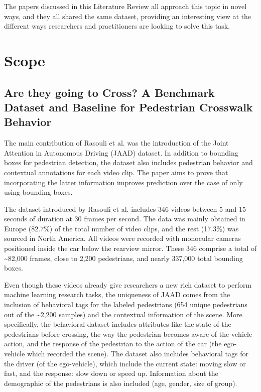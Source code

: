 \documentclass[journal,letterpaper]{IEEEtran}
\begin{document}
The papers discussed in this Literature Review all approach this topic in novel ways, and they all shared the same dataset, providing an interesting view at the different ways researchers and practitioners are looking to solve this task.
\section{Scope}\label{sec:scope}
\subsection{Are they going to Cross? A Benchmark Dataset and Baseline for Pedestrian Crosswalk Behavior}\label{are-they-going-to-cross-a-benchmark-dataset-and-baseline-for-pedestrian-crosswalk-behavior-rasouli2017iccvw}
The main contribution of Rasouli et al. was the introduction of the Joint Attention in Autonomous Driving (JAAD) dataset. In addition to bounding boxes for pedestrian detection, the dataset also includes pedestrian behavior and contextual annotations for each video clip. The paper aims to prove that incorporating the latter information improves prediction over the case of only using bounding boxes.

The dataset introduced by Rasouli et al. includes 346 videos between 5 and 15 seconds of duration at 30 frames per second. The data was mainly obtained in Europe (82.7\%) of the total number of video clips, and the rest (17.3\%) was sourced in North America. All videos were recorded with monocular cameras positioned inside the car below the rearview mirror. These 346 comprise a total of \textasciitilde82,000 frames, close to 2,200 pedestrians, and nearly 337,000 total bounding boxes.

Even though these videos already give researchers a new rich dataset to perform machine learning research tasks, the uniqueness of JAAD comes from the inclusion of behavioral tags for the labeled pedestrians (654 unique pedestrians out of the \textasciitilde2,200 samples) and the contextual information of the scene. More specifically, the behavioral
dataset includes attributes like the state of the pedestrians before crossing, the way the pedestrian becomes aware of the vehicle action, and the response of the pedestrian to the action of the car (the ego-vehicle which recorded the scene). The dataset also includes behavioral tags for the driver (of the ego-vehicle), which include the current state: moving slow or fast, and the response: slow down or speed up. Information about the demographic of the pedestrians is also included (age, gender, size of group).
\end{document}
